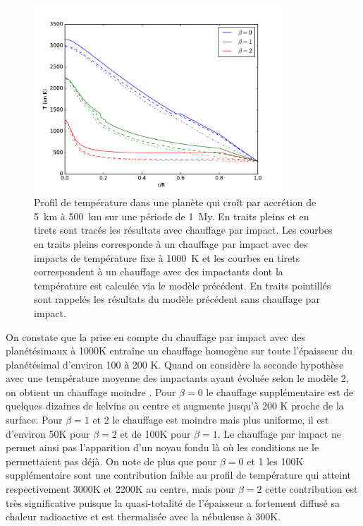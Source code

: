 \documentclass[10pt,a4paper]{article}
\numberwithin{equation}{section}
\begin{document}
\begin{figure}[h!]
\centering
\includegraphics[height=7cm]{./figures/graph_sim3.pdf}
\caption{Profil de température dans une planète qui croît par accrétion de \SI{5}{km} à \SI{500}{km} sur une période de \SI{1}{My}. En traits pleins et en tirets sont tracés les résultats avec chauffage par impact. Les courbes en traits pleins corresponde à un chauffage par impact avec des impacts de température fixe à \SI{1000}{K} et les courbes en tirets correspondent à un chauffage avec des impactants dont la température est calculée via le modèle précédent. En traits pointillés sont rappelés les résultats du modèle précédent sans chauffage par impact.}
\label{fig3}
\end{figure}

On constate que la prise en compte du chauffage par impact avec des planétésimaux à 1000K entraîne un chauffage homogène sur toute l'épaisseur du planétésimal d'environ 100 à 200 K. 
Quand on considère la seconde hypothèse avec une température moyenne des impactants ayant évoluée selon le modèle 2, on obtient un chauffage moindre . Pour $\beta =0$ le chauffage supplémentaire est de quelques dizaines de kelvins au centre et augmente jusqu'à 200 K proche de la surface. Pour $\beta =1$ et 2 le chauffage est moindre mais plus uniforme, il est d'environ 50K pour $\beta=2$ et de 100K pour $\beta=1$.
Le chauffage par impact ne permet ainsi pas l'apparition d'un noyau fondu là où les conditions ne le permettaient pas déjà. On note de plus que pour $\beta =0$ et 1 les 100K supplémentaire sont une contribution faible au profil de température qui atteint respectivement 3000K et 2200K au centre, mais pour $\beta = 2$ cette contribution est très significative puisque la quasi-totalité de l'épaisseur a fortement diffusé sa chaleur radioactive et est thermalisée avec la nébuleuse à 300K.
\end{document}
